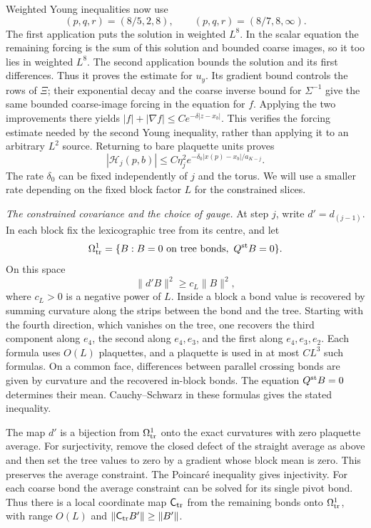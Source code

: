 \documentclass[11pt,letterpaper,reqno]{amsart}
\theoremstyle{definition}
\theoremstyle{remark}
\begin{document}
Weighted Young inequalities now use
\[
 (p,q,r)=(8/5,2,8),\qquad (p,q,r)=(8/7,8,\infty).
\]
The first application puts the solution in weighted $L^8$.
In the scalar equation the remaining forcing is the sum of this
solution and bounded coarse images, so it too lies in weighted
$L^8$. The second application bounds the solution and its first
differences. Thus it proves the estimate for $u_y$. Its gradient
bound controls the rows of $\Xi$; their exponential decay and
the coarse inverse bound for $\Sigma^{-1}$ give the same
bounded coarse-image forcing in the equation for $f$. Applying
the two improvements there yields
$|f|+|\nabla f|\le Ce^{-\delta|z-x_b|}$.
This verifies the forcing estimate needed by the second Young
inequality, rather than applying it to an arbitrary $L^2$ source.
Returning to bare plaquette units proves
\begin{equation}\label{eq:free-minimizer-decay}
 |\mathcal H_j(p,b)|\le C\eta_j^2
               e^{-\delta_0|x(p)-x_b|/a_{K-j}}.
\end{equation}
The rate $\delta_0$ can be fixed independently of $j$ and the
torus. We will use a smaller rate depending on the fixed block
factor $L$ for the constrained slices.

\emph{The constrained covariance and the choice of gauge.}
At step $j$, write $d'=d_{(j-1)}$. In each block fix the
lexicographic tree from its centre, and let
\[
 \Omega^1_{\rm tr}
 =\{B:B=0\text{ on tree bonds},\ Q^{\rm st}B=0\}.
\]
On this space
\[
 \|d'B\|^2\ge c_L\|B\|^2,
\]
where $c_L>0$ is a negative power of $L$. Inside a block a bond
value is recovered by summing curvature along the strips between
the bond and the tree. Starting with the fourth direction, which
vanishes on the tree, one recovers the third component along
$e_4$, the second along $e_4,e_3$, and the first along
$e_4,e_3,e_2$. Each formula uses $O(L)$ plaquettes, and a
plaquette is used in at most $CL^3$ such formulas. On a common
face, differences between parallel crossing bonds are given by
curvature and the recovered in-block bonds. The equation
$Q^{\rm st}B=0$ determines their mean. Cauchy--Schwarz in these
formulas gives the stated inequality.

The map $d'$ is a bijection from $\Omega^1_{\rm tr}$ onto
the exact curvatures with zero plaquette average. For surjectivity,
remove the closed defect of the straight average as above and then
set the tree values to zero by a gradient whose block mean is zero.
This preserves the average constraint. The Poincar\'e inequality
gives injectivity. For each coarse bond the average constraint
can be solved for its single pivot bond. Thus there is a local
coordinate map $\mathsf C_{\rm tr}$ from the remaining bonds
onto $\Omega^1_{\rm tr}$, with range $O(L)$ and
$\|\mathsf C_{\rm tr}B'\|\ge\|B'\|$.
\end{document}

